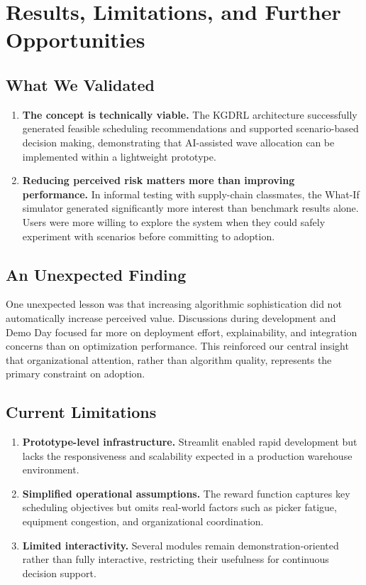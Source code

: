 \section{Results, Limitations, and Further Opportunities}
\label{sec:results}

\subsection{What We Validated}

\begin{enumerate}
\item \textbf{The concept is technically viable.} The KGDRL architecture successfully generated feasible scheduling recommendations and supported scenario-based decision making, demonstrating that AI-assisted wave allocation can be implemented within a lightweight prototype.

\item \textbf{Reducing perceived risk matters more than improving performance.} In informal testing with supply-chain classmates, the What-If simulator generated significantly more interest than benchmark results alone. Users were more willing to explore the system when they could safely experiment with scenarios before committing to adoption.

\end{enumerate}

\subsection{An Unexpected Finding}

One unexpected lesson was that increasing algorithmic sophistication did not automatically increase perceived value. Discussions during development and Demo Day focused far more on deployment effort, explainability, and integration concerns than on optimization performance. This reinforced our central insight that organizational attention, rather than algorithm quality, represents the primary constraint on adoption.

\subsection{Current Limitations}

\begin{enumerate}
\item \textbf{Prototype-level infrastructure.} Streamlit enabled rapid development but lacks the responsiveness and scalability expected in a production warehouse environment.

\item \textbf{Simplified operational assumptions.} The reward function captures key scheduling objectives but omits real-world factors such as picker fatigue, equipment congestion, and organizational coordination.

\item \textbf{Limited interactivity.} Several modules remain demonstration-oriented rather than fully interactive, restricting their usefulness for continuous decision support.


\end{enumerate}

